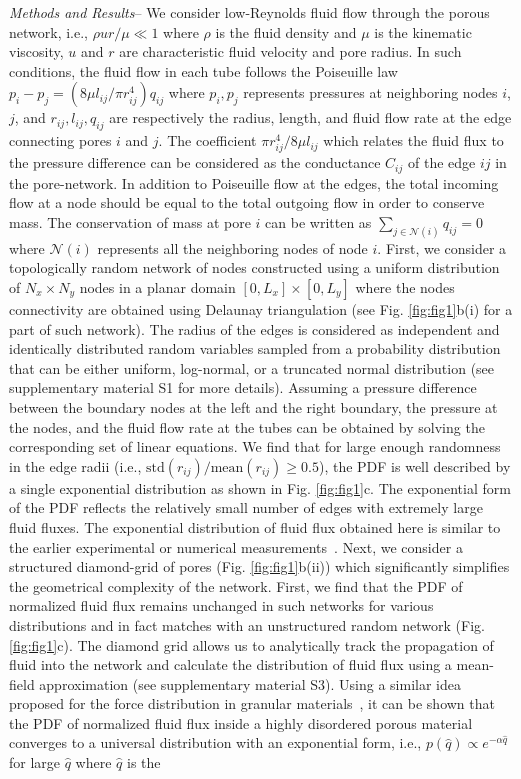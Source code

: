 \documentclass[%
 reprint,
 amsmath,amssymb,
 aps,
]{revtex4-1}
\begin{document}
\textit{Methods and Results}-- We consider low-Reynolds fluid flow through the porous network, i.e.,  $\rho u r/\mu \ll 1$ where $\rho$ is the fluid density and $\mu$ is the kinematic viscosity, $u$ and $r$ are characteristic fluid velocity and pore radius. In such conditions, the fluid flow in each tube follows the Poiseuille law
 $ p_i - p_j  = ({8 \mu l_{ij}}/{\pi r_{ij}^4}) q_{ij}$ where $p_i,p_j$ represents pressures at neighboring nodes $i$, $j$, and $r_{ij}, l_{ij}, q_{ij}$ are respectively the radius, length, and fluid flow rate at the edge connecting pores $i$ and $j$. The coefficient ${\pi r_{ij}^4}/{8 \mu l_{ij}}$ which relates the fluid flux to the pressure difference can be considered as the conductance $C_{ij}$ of the edge $ij$ in the pore-network. In addition to Poiseuille flow at the edges,  the total incoming flow at a node should be equal to the total outgoing flow in order to conserve mass. The conservation of mass at pore $i$ can be written as $\sum_{j\in \mathcal{N}(i)} q_{ij} =0$ where $\mathcal{N}(i)$ represents all the neighboring nodes of node $i$. First, we consider a topologically random network of nodes constructed using a uniform distribution of $N_x\times N_y$ nodes in a planar domain $\left[0,L_x\right]\times \left[0,L_y\right]$ where the nodes connectivity are obtained using Delaunay triangulation (see Fig. \ref{fig:fig1}b(i) for a part of such network). The radius of the edges is considered as independent and identically distributed random variables sampled from a probability distribution that can be either uniform, log-normal, or a truncated normal distribution (see supplementary material S1 for more details).  Assuming a pressure difference between the boundary nodes at the left and the right boundary, the pressure at the nodes, and the fluid flow rate at the tubes can be obtained by solving the corresponding set of linear equations. We find that for large enough randomness in the edge radii (i.e., $\text{std}(r_{ij})/\text{mean}(r_{ij})\geq 0.5$), the PDF is well described by a single exponential distribution as shown in Fig. \ref{fig:fig1}c. The exponential form of the PDF reflects the relatively small number of edges with extremely large fluid fluxes. The exponential distribution of fluid flux obtained here is similar to the earlier experimental or numerical measurements~\cite{datta2013spatial,shima2021,alim2017local}.  Next, we consider a structured diamond-grid of pores (Fig. \ref{fig:fig1}b(ii)) which significantly simplifies the geometrical complexity of the network. First, we find that the PDF of normalized fluid flux remains unchanged in such networks for various distributions and in fact matches with an unstructured random network (Fig. \ref{fig:fig1}c). The diamond grid allows us to analytically track the propagation of fluid into the network and calculate the distribution of fluid flux using a mean-field approximation (see supplementary material S3). Using a similar idea proposed for the force distribution in granular materials~\cite{liu1995force,coppersmith1996model,alim2017local}, it can be shown that the PDF of normalized fluid flux inside a highly disordered porous material converges to a universal distribution with an exponential form, i.e., $p(\hat{q}) \propto e^{-\alpha \hat{q}}$ for large $\hat{q}$ where $\hat{q}$ is the 
\end{document}
